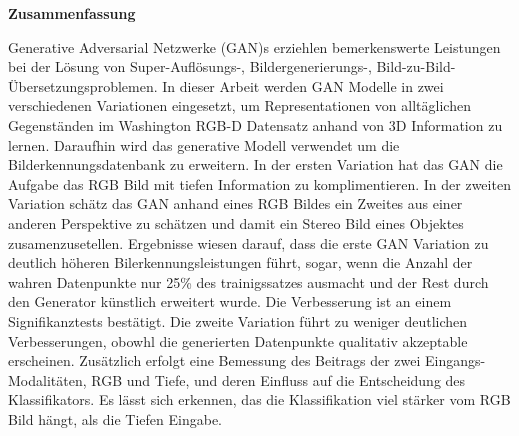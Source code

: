 \thispagestyle{empty}
\vspace*{0.2cm}

\begin{center}
    \textbf{Zusammenfassung}
\end{center}

\vspace*{0.2cm}

\noindent 

Generative Adversarial Netzwerke (GAN)s erziehlen bemerkenswerte Leistungen bei der
L{\"o}sung von Super-Aufl{\"o}sungs-, Bildergenerierungs-,
Bild-zu-Bild-{\"U}bersetzungsproblemen. In dieser Arbeit werden GAN Modelle in zwei
verschiedenen Variationen eingesetzt, um Representationen von allt{\"a}glichen
Gegenst{\"a}nden im Washington RGB-D Datensatz anhand von 3D Information zu lernen.
Daraufhin wird das generative Modell verwendet um die Bilderkennungsdatenbank zu
erweitern. In der ersten Variation hat das GAN die Aufgabe das RGB Bild mit tiefen
Information zu komplimentieren. In der zweiten Variation sch{\"a}tz das GAN anhand eines
RGB Bildes ein Zweites aus einer anderen Perspektive zu sch{\"a}tzen und damit ein Stereo Bild
eines Objektes zusamenzusetellen. Ergebnisse wiesen darauf, dass die erste GAN Variation
zu deutlich h{\"o}heren Bilerkennungsleistungen f{\"u}hrt, sogar, wenn die Anzahl der
wahren Datenpunkte nur 25\% des trainigssatzes ausmacht und der Rest durch den Generator
k{\"u}nstlich erweitert wurde. Die Verbesserung ist an einem Signifikanztests
best{\"a}tigt. Die zweite Variation f{\"u}hrt zu weniger deutlichen Verbesserungen, obowhl
die generierten Datenpunkte qualitativ akzeptable erscheinen. Zus{\"a}tzlich erfolgt eine
Bemessung des Beitrags der zwei Eingangs-Modalit{\"a}ten, RGB und Tiefe, und deren
Einfluss auf die Entscheidung des Klassifikators. Es l{\"a}sst sich erkennen, das die
Klassifikation viel st{\"a}rker vom RGB Bild h{\"a}ngt, als die Tiefen Eingabe.

